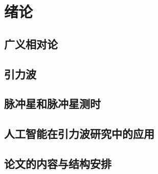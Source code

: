 \chapter{绪论}
\label{chap:绪论}
\section{广义相对论}
\section{引力波}
\section{脉冲星和脉冲星测时}
\section{人工智能在引力波研究中的应用}
\section{论文的内容与结构安排}